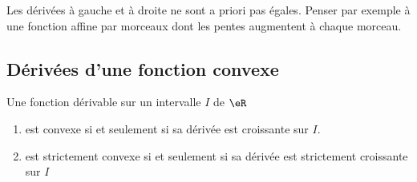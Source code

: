 \begin{remark}
    Les dérivées à gauche et à droite ne sont a priori pas égales. Penser par exemple à une fonction affine par morceaux dont les pentes augmentent à chaque morceau.
\end{remark}

\subsection{Dérivées d'une fonction convexe}

\begin{proposition} \label{PropYKwTDPX}
    Une fonction dérivable sur un intervalle \( I\) de \( \eR\) 
    \begin{enumerate}
        \item       \label{ITEMooUTSAooJvhZNm}
            est convexe si et seulement si sa dérivée est croissante sur \( I\).
        \item       \label{ITEMooLLSIooFwkxtV}
            est strictement convexe si et seulement si sa dérivée est strictement croissante sur \( I\)
    \end{enumerate}
\end{proposition}


